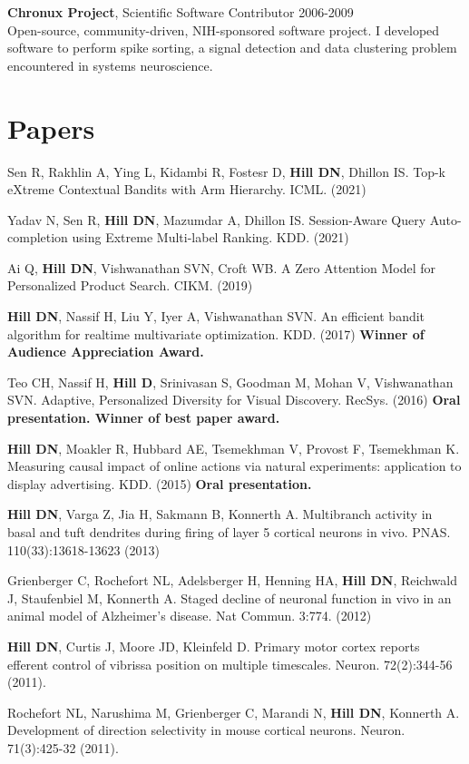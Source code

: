 \documentclass[line,11pt]{res}
\begin{document}
\begin{resume}
    	\textbf{Chronux Project}, Scientific Software Contributor 2006-2009 \\
    	Open-source, community-driven, NIH-sponsored software project. I developed software to perform spike sorting, a signal detection and data clustering problem encountered in systems neuroscience. 
    
\section{Papers}
\vspace{0.1in}
Sen R, Rakhlin A, Ying L, Kidambi R, Fostesr D, \textbf{Hill DN}, Dhillon IS. Top-k eXtreme Contextual Bandits with Arm Hierarchy.  ICML. (2021)

Yadav N, Sen R, \textbf{Hill DN}, Mazumdar A, Dhillon IS. Session-Aware Query Auto-completion using Extreme Multi-label Ranking.  KDD. (2021)

Ai Q, \textbf{Hill DN}, Vishwanathan SVN, Croft WB. A Zero Attention Model for Personalized Product Search. CIKM. (2019)

\textbf{Hill DN}, Nassif H, Liu Y, Iyer A, Vishwanathan SVN. An efficient bandit algorithm for realtime multivariate optimization. KDD. (2017) \textbf{Winner of Audience Appreciation Award.}

Teo CH, Nassif H, \textbf{Hill D}, Srinivasan S, Goodman M, Mohan V, Vishwanathan SVN. Adaptive, Personalized Diversity for Visual Discovery. RecSys. (2016) \textbf{Oral presentation. Winner of best paper award.}

\textbf{Hill DN}, Moakler R, Hubbard AE, Tsemekhman V, Provost F, Tsemekhman K.  Measuring causal impact of online actions via natural experiments: application to display advertising. KDD. (2015) \textbf{Oral presentation.}

\textbf{Hill DN}, Varga Z, Jia H, Sakmann B, Konnerth A. Multibranch activity in basal and tuft dendrites during firing of layer 5 cortical neurons in vivo. PNAS. 110(33):13618-13623 (2013)

Grienberger C, Rochefort NL, Adelsberger H, Henning HA, \textbf{Hill DN}, Reichwald J, Staufenbiel M, Konnerth A. Staged decline of neuronal function in vivo in an animal model of Alzheimer's disease. Nat Commun. 3:774. (2012) 

\textbf{Hill DN}, Curtis J, Moore JD, Kleinfeld D.  Primary motor cortex reports efferent control of vibrissa position on multiple timescales. Neuron. 72(2):344-56 (2011).

Rochefort NL, Narushima M, Grienberger C, Marandi N, \textbf{Hill DN}, Konnerth A. Development of direction selectivity in mouse cortical neurons. Neuron. 71(3):425-32 (2011). 


\end{resume}
\end{document}
